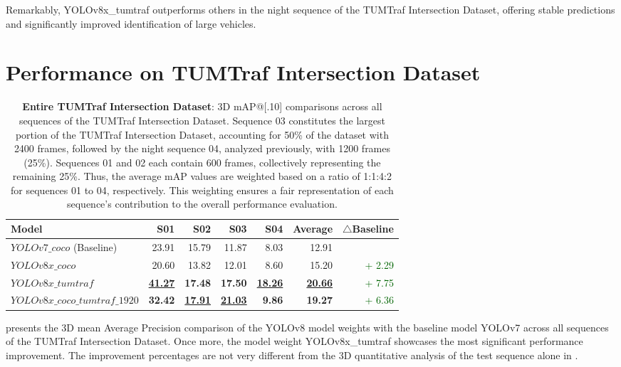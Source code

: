 Remarkably, YOLOv8x\_tumtraf outperforms others in the night sequence of the TUMTraf Intersection Dataset, offering stable predictions and significantly improved identification of large vehicles.

\section{Performance on TUMTraf Intersection Dataset} \label{sec:ablation_study_intersection}

\begin{table}[htb]%
	\centering
	\begin{tabular}[htb]{lrrrrrr}
		\toprule
		\textbf{Model} & \textbf{S01} & \textbf{S02} & \textbf{S03} & \textbf{S04} & \textbf{Average} & \textbf{$\triangle$Baseline} \\
		\midrule
		$YOLOv7\_coco$ (Baseline) & 23.91 & 15.79 & 11.87 & 8.03 & 12.91 \\
		$YOLOv8x\_coco$ & 20.60 & 13.82 & 12.01 & 8.60 & 15.20 & \textcolor{darkgreen}{+ 2.29}  \\
		$YOLOv8x\_tumtraf$ & \underline{\textbf{41.27}} & \textbf{17.48} & \textbf{17.50} & \underline{\textbf{18.26}} & \underline{\textbf{20.66}} & \textcolor{darkgreen}{+ 7.75}  \\
		$YOLOv8x\_coco\_tumtraf\_1920$ & \textbf{32.42} & \underline{\textbf{17.91}} & \underline{\textbf{21.03}} & \textbf{9.86} & \textbf{19.27} & \textcolor{darkgreen}{+ 6.36}  \\
		\midrule
	\end{tabular}
	\caption{\textbf{Entire TUMTraf Intersection Dataset}: 3D mAP@[.10] comparisons across all sequences of the TUMTraf Intersection Dataset. Sequence 03 constitutes the largest portion of the TUMTraf Intersection Dataset, accounting for 50\% of the dataset with 2400 frames, followed by the night sequence 04, analyzed previously, with 1200 frames (25\%). Sequences 01 and 02 each contain 600 frames, collectively representing the remaining 25\%. Thus, the average mAP values are weighted based on a ratio of 1:1:4:2 for sequences 01 to 04, respectively. This weighting ensures a fair representation of each sequence's contribution to the overall performance evaluation.}
	\label{tab:ablation_study_intersection}
\end{table}

 presents the 3D mean Average Precision comparison of the YOLOv8 model weights with the baseline model YOLOv7 across all sequences of the TUMTraf Intersection Dataset. Once more, the model weight YOLOv8x\_tumtraf showcases the most significant performance improvement. The improvement percentages are not very different from the 3D quantitative analysis of the test sequence alone in .

